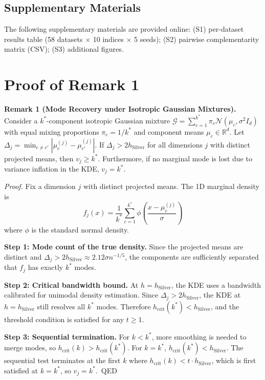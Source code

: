 \documentclass[journal]{IEEEtran}
\begin{document}
\subsection*{Supplementary Materials}
The following supplementary materials are provided online: (S1) per-dataset results table (58 datasets $\times$ 10 indices $\times$ 5 seeds); (S2) pairwise complementarity matrix (CSV); (S3) additional figures.

\appendices
\section{Proof of Remark 1}
\label{app:a}

\textbf{Remark 1 (Mode Recovery under Isotropic Gaussian Mixtures).} Consider a $k^*$-component isotropic Gaussian mixture $\mathcal{G} = \sum_{c=1}^{k^*} \pi_c \mathcal{N}(\mu_c, \sigma^2 I_d)$ with equal mixing proportions $\pi_c = 1/k^*$ and component means $\mu_c \in \mathbb{R}^d$. Let $\Delta_j = \min_{c \neq c'} |\mu_c^{(j)} - \mu_{c'}^{(j)}|$. If $\Delta_j > 2 h_{\mathrm{Silver}}$ for all dimensions $j$ with distinct projected means, then $v_j \geq k^*$. Furthermore, if no marginal mode is lost due to variance inflation in the KDE, $v_j = k^*$.

\textit{Proof.} Fix a dimension $j$ with distinct projected means. The 1D marginal density is
\begin{equation}
f_j(x) = \frac{1}{k^*} \sum_{c=1}^{k^*} \phi\left(\frac{x - \mu_c^{(j)}}{\sigma}\right)
\label{eq:marginal}
\end{equation}
where $\phi$ is the standard normal density.

\textbf{Step 1: Mode count of the true density.} Since the projected means are distinct and $\Delta_j > 2 h_{\mathrm{Silver}} \approx 2.12 \sigma n^{-1/5}$, the components are sufficiently separated that $f_j$ has exactly $k^*$ modes.

\textbf{Step 2: Critical bandwidth bound.} At $h = h_{\mathrm{Silver}}$, the KDE uses a bandwidth calibrated for unimodal density estimation. Since $\Delta_j > 2 h_{\mathrm{Silver}}$, the KDE at $h = h_{\mathrm{Silver}}$ still resolves all $k^*$ modes. Therefore $h_{\mathrm{crit}}(k^*) < h_{\mathrm{Silver}}$, and the threshold condition is satisfied for any $t \geq 1$.

\textbf{Step 3: Sequential termination.} For $k < k^*$, more smoothing is needed to merge modes, so $h_{\mathrm{crit}}(k) > h_{\mathrm{crit}}(k^*)$. For $k = k^*$, $h_{\mathrm{crit}}(k^*) < h_{\mathrm{Silver}}$. The sequential test terminates at the first $k$ where $h_{\mathrm{crit}}(k) < t \cdot h_{\mathrm{Silver}}$, which is first satisfied at $k = k^*$, so $v_j = k^*$.~\textsc{QED}
\end{document}
